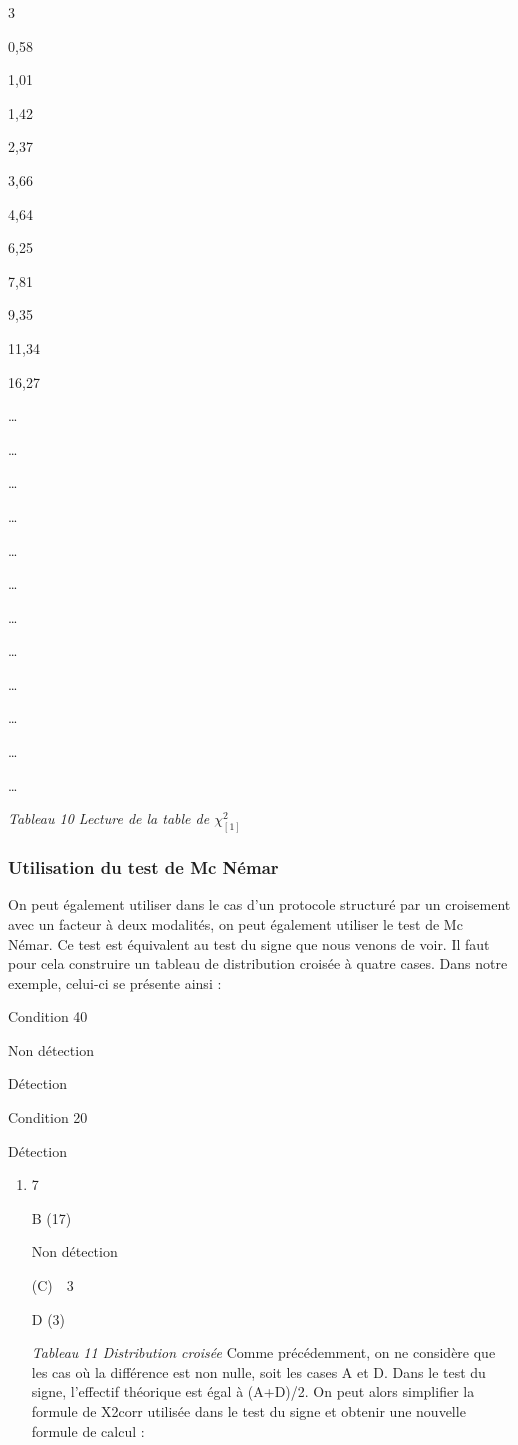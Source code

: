 \documentclass[]{book}
\providecommand{\tightlist}{%
  \setlength{\itemsep}{0pt}\setlength{\parskip}{0pt}}
\theoremstyle{definition}
\theoremstyle{definition}
\theoremstyle{definition}
\theoremstyle{remark}
\begin{document}
3

0,58

1,01

1,42

2,37

3,66

4,64

6,25

7,81

9,35

11,34

16,27

\ldots{}

\ldots{}

\ldots{}

\ldots{}

\ldots{}

\ldots{}

\ldots{}

\ldots{}

\ldots{}

\ldots{}

\ldots{}

\ldots{}

\emph{Tableau 10 Lecture de la table de \(\chi ^2_{[1]}\)}

\hypertarget{utilisation-du-test-de-mc-nemar}{%
\subsubsection{Utilisation du test de Mc
Némar}\label{utilisation-du-test-de-mc-nemar}}

On peut également utiliser dans le cas d'un protocole structuré par un
croisement avec un facteur à deux modalités, on peut également utiliser
le test de Mc Némar. Ce test est équivalent au test du signe que nous
venons de voir. Il faut pour cela construire un tableau de distribution
croisée à quatre cases. Dans notre exemple, celui-ci se présente ainsi :

Condition 40

Non détection

Détection

Condition 20

Détection

\begin{enumerate}
\def\labelenumi{(\Alph{enumi})}
\tightlist
\item
  7

  B (17)

  Non détection

  (C)~~3

  D (3)

  \emph{Tableau 11 Distribution croisée} Comme précédemment, on ne
  considère que les cas où la différence est non nulle, soit les cases A
  et D. Dans le test du signe, l'effectif théorique est égal à (A+D)/2.
  On peut alors simplifier la formule de X2corr utilisée dans le test du
  signe et obtenir une nouvelle formule de calcul :
\end{enumerate}
\end{document}
